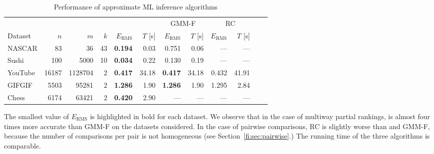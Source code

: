 \begin{table}[ht]
  \vspace{-0.3cm}
  \caption{Performance of approximate ML inference algorithms}
  \label{fi:tab:approxalg}
  \centering
  \small{
  \begin{tabular}{l rrr rr rr rr rr}
    \toprule
            &             &               &          & \multicolumn{2}{c}{\LSR{}}            & \multicolumn{2}{c}{GMM-F}          & \multicolumn{2}{c}{RC} \\
                                                       \cmidrule(l){5-6}                    \cmidrule(l){7-8}                    \cmidrule(l){9-10}
    Dataset &         $n$ &           $m$ &      $k$ &     $E_{\text{RMS}}$ &     $T$ [s] &     $E_{\text{RMS}}$ &     $T$ [s] & $E_{\text{RMS}}$ & $T$ [s] \\
    \midrule
    NASCAR  &    \num{83} &      \num{36} & \num{43} & \bfseries\num{0.194} &  \num{0.03} &          \num{0.751} &  \num{0.06} &         --- &         --- \\
    Sushi   &   \num{100} &    \num{5000} & \num{10} & \bfseries\num{0.034} &  \num{0.22} &          \num{0.130} &  \num{0.19} &         --- &         --- \\
    \addlinespace                                                                                                             
    YouTube & \num{16187} & \num{1128704} &  \num{2} & \bfseries\num{0.417} & \num{34.18} & \bfseries\num{0.417} & \num{34.18} & \num{0.432} & \num{41.91} \\
    GIFGIF  &  \num{5503} &   \num{95281} &  \num{2} & \bfseries\num{1.286} &  \num{1.90} & \bfseries\num{1.286} &  \num{1.90} & \num{1.295} &  \num{2.84} \\
    \addlinespace                                                                                                             
    Chess   &  \num{6174} &   \num{63421} &  \num{2} & \bfseries\num{0.420} &  \num{2.90} &                  --- &         --- &         --- &         --- \\
    \bottomrule
  \end{tabular}
  }
\end{table}

The smallest value of $E_{\text{RMS}}$ is highlighted in bold for each dataset.
We observe that in the case of multiway partial rankings, \LSR{} is almost four times more accurate than GMM-F on the datasets considered.
In the case of pairwise comparisons, RC is slightly worse than \LSR{} and GMM-F, because the number of comparisons per pair is not homogeneous (see Section~\ref{fi:sec:pairwise}.)
The running time of the three algorithms is comparable.

